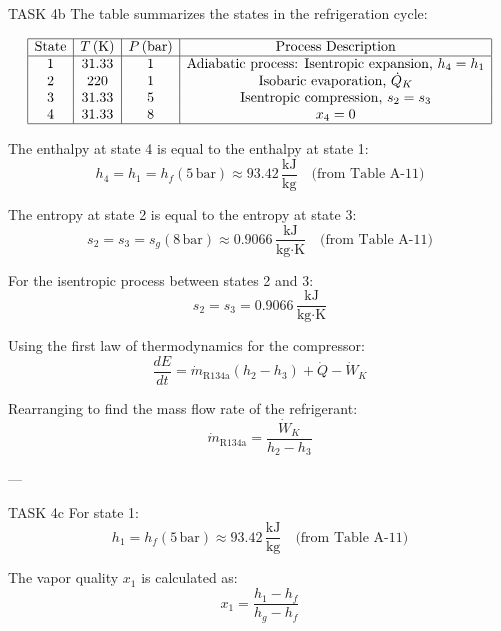 TASK 4b  
The table summarizes the states in the refrigeration cycle:  

\[
\begin{array}{|c|c|c|c|}
\hline
\text{State} & T \, (\text{K}) & P \, (\text{bar}) & \text{Process Description} \\
\hline
1 & 31.33 & 1 & \text{Adiabatic process: Isentropic expansion, } h_4 = h_1 \\
2 & 220 & 1 & \text{Isobaric evaporation, } \dot{Q}_K \\
3 & 31.33 & 5 & \text{Isentropic compression, } s_2 = s_3 \\
4 & 31.33 & 8 & x_4 = 0 \\
\hline
\end{array}
\]

The enthalpy at state 4 is equal to the enthalpy at state 1:  
\[
h_4 = h_1 = h_f(5 \, \text{bar}) \approx 93.42 \, \frac{\text{kJ}}{\text{kg}} \quad \text{(from Table A-11)}  
\]

The entropy at state 2 is equal to the entropy at state 3:  
\[
s_2 = s_3 = s_g(8 \, \text{bar}) \approx 0.9066 \, \frac{\text{kJ}}{\text{kg·K}} \quad \text{(from Table A-11)}  
\]

For the isentropic process between states 2 and 3:  
\[
s_2 = s_3 = 0.9066 \, \frac{\text{kJ}}{\text{kg·K}}  
\]

Using the first law of thermodynamics for the compressor:  
\[
\frac{dE}{dt} = \dot{m}_{\text{R134a}} (h_2 - h_3) + \dot{Q} - \dot{W}_K  
\]

Rearranging to find the mass flow rate of the refrigerant:  
\[
\dot{m}_{\text{R134a}} = \frac{\dot{W}_K}{h_2 - h_3}  
\]

---

TASK 4c  
For state 1:  
\[
h_1 = h_f(5 \, \text{bar}) \approx 93.42 \, \frac{\text{kJ}}{\text{kg}} \quad \text{(from Table A-11)}  
\]

The vapor quality \( x_1 \) is calculated as:  
\[
x_1 = \frac{h_1 - h_f}{h_g - h_f}  
\]
